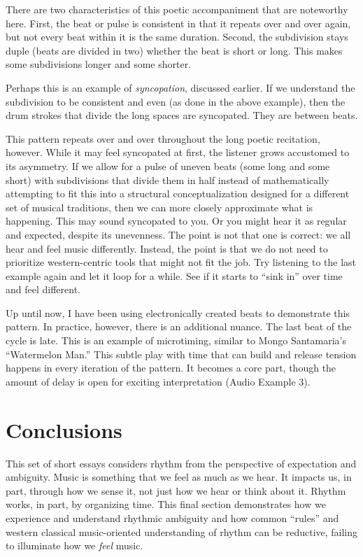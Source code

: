 \documentclass[twoside]{article}
\begin{document}
There are two characteristics of this poetic accompaniment that are
noteworthy here. First, the beat or pulse is consistent in that it
repeats over and over again, but not every beat within it is the same
duration. Second, the subdivision stays duple (beats are divided in two)
whether the beat is short or long. This makes some subdivisions longer
and some shorter.

Perhaps this is an example of \emph{syncopation}, discussed earlier. If
we understand the subdivision to be consistent and even (as done in the
above example), then the drum strokes that divide the long spaces are
syncopated. They are between beats.

This pattern repeats over and over throughout the long poetic
recitation, however. While it may feel syncopated at first, the listener
grows accustomed to its asymmetry. If we allow for a pulse of uneven
beats (some long and some short) with subdivisions that divide them in
half instead of mathematically attempting to fit this into a structural
conceptualization designed for a different set of musical traditions,
then we can more closely approximate what is happening. This may sound
syncopated to you. Or you might hear it as regular and expected, despite
its unevenness. The point is not that one is correct: we all hear and
feel music differently. Instead, the point is that we do not need to
prioritize western-centric tools that might not fit the job. Try
listening to the last example again and let it loop for a while. See if
it starts to ``sink in'' over time and feel different.

Up until now, I have been using electronically created beats to
demonstrate this pattern. In practice, however, there is an additional
nuance. The last beat of the cycle is late. This is an example of
microtiming, similar to Mongo Santamaria's ``Watermelon Man.'' This
subtle play with time that can build and release tension happens in
every iteration of the pattern. It becomes a core part, though the
amount of delay is open for exciting interpretation (Audio Example 3).

\hypertarget{conclusions}{%
\section*{Conclusions}\label{conclusions}}

This set of short essays considers rhythm from the perspective of
expectation and ambiguity. Music is something that we feel as much as we
hear. It impacts us, in part, through how we sense it, not just how we
hear or think about it. Rhythm works, in part, by organizing time. This
final section demonstrates how we experience and understand rhythmic
ambiguity and how common ``rules'' and western classical music-oriented
understanding of rhythm can be reductive, failing to illuminate how we
\emph{feel} music.
\end{document}
